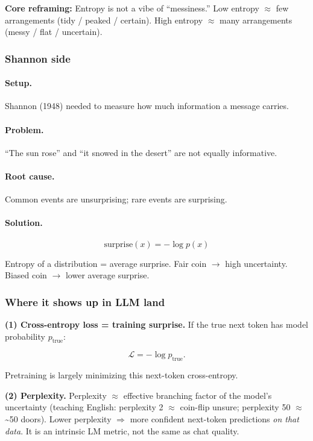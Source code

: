 \documentclass[11pt,a4paper]{article}
\begin{document}
\textbf{Core reframing:} Entropy is not a vibe of ``messiness.'' Low entropy $\approx$ few arrangements (tidy / peaked / certain). High entropy $\approx$ many arrangements (messy / flat / uncertain).


\subsubsection{Shannon side}


\paragraph{Setup.}

Shannon (1948) needed to measure how much information a message carries.


\paragraph{Problem.}

``The sun rose'' and ``it snowed in the desert'' are not equally informative.


\paragraph{Root cause.}

Common events are unsurprising; rare events are surprising.


\paragraph{Solution.}

\[
\text{surprise}(x) = -\log p(x)
\]

Entropy of a distribution = average surprise. Fair coin $\rightarrow$ high uncertainty. Biased coin $\rightarrow$ lower average surprise.


\subsubsection{Where it shows up in LLM land}


\textbf{(1) Cross-entropy loss = training surprise.}   If the true next token has model probability \(p_{\text{true}}\):

\[
\mathcal{L} = -\log p_{\text{true}}.
\]

Pretraining is largely minimizing this next-token cross-entropy.


\textbf{(2) Perplexity.}   Perplexity $\approx$ effective branching factor of the model's uncertainty (teaching English: perplexity 2 $\approx$ coin-flip unsure; perplexity 50 $\approx$ \textasciitilde{}50 doors). Lower perplexity $\Rightarrow$ more confident next-token predictions \textit{on that data}. It is an intrinsic LM metric, not the same as chat quality.
\end{document}
